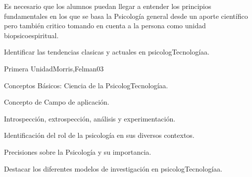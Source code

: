 \begin{syllabus}


\begin{justification}
Es necesario que los alumnos puedan llegar a entender los principios fundamentales en  los que se basa la Psicología general desde un aporte científico pero también critico tomando en cuenta a la persona como unidad biopsicoespiritual.
\end{justification}

\begin{goals}
\item Identificar las tendencias clasicas y actuales en psicologTecnologíaa.
\end{goals}

\begin{outcomes}
\end{outcomes}

\begin{unit}{Primera Unidad}{Morris,Felman}{0}{3}
\begin{topics}
	\item Conceptos Básicos: Ciencia de la PsicologTecnologíaa.
	\item Concepto de Campo de aplicación.
	\item Introspección, extrospección, análisis y experimentación.
\end{topics}
\begin{unitgoals}
	\item Identificación del rol de la psicología en sus diversos contextos.
	\item Precisiones sobre la Psicología y su importancia.
	\item Destacar los diferentes modelos de investigación en psicologTecnologíaa.
\end{unitgoals}
\end{unit}


\end{syllabus}
